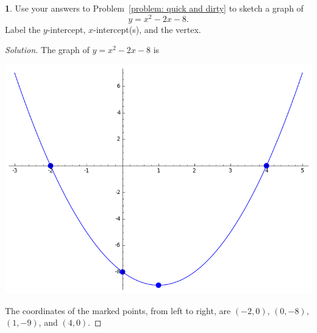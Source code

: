 \documentclass[12pt]{amsart}
\theoremstyle{definition}
\newtheorem{thm}{}
\begin{document}
\newpage

\begin{thm}\label{problem: graph quick and dirty}
  Use your answers to Problem~\ref{problem: quick and dirty} to sketch a graph of
  $$y = x^2 - 2x - 8 .$$
  Label the $y$-intercept, $x$-intercept(s), and the vertex.
\end{thm}
\begin{proof}[Solution]
  The graph of $y = x^2 - 2x - 8$ is
  \begin{center}
    \includegraphics[scale=0.5]{quickanddirty}
  \end{center}
  The coordinates of the marked points, from left to right, are $(-2,0)$, $(0,-8)$, $(1,-9)$, and $(4,0)$.
\end{proof}
\end{document}
